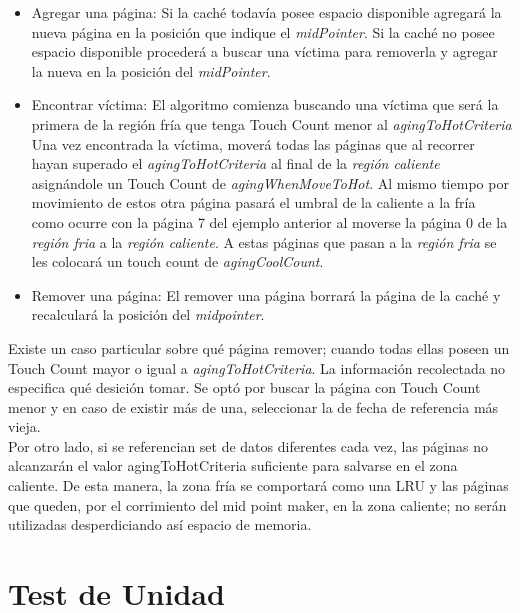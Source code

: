 \documentclass[11pt, a4paper, spanish]{article}
\begin{document}
\begin{itemize}
	\item{Agregar una p\'agina:
		Si la cach\'e todav\'ia posee espacio disponible agregar\'a la nueva p\'agina en la posici\'on que indique el \textit{midPointer}.
		Si la cach\'e no posee espacio disponible proceder\'a a buscar una v\'ictima para removerla y agregar la nueva en la posici\'on del \textit{midPointer}.
	}
	\item{Encontrar v\'ictima: }
		El algoritmo comienza buscando una v\'ictima que ser\'a la primera de la regi\'on fr\'ia que tenga Touch Count menor al \textit{agingToHotCriteria}
		Una vez encontrada la v\'ictima, mover\'a todas las p\'aginas que al recorrer hayan superado el  \textit{agingToHotCriteria} al
		final de la \textit{regi\'on caliente} asign\'andole un Touch Count de \textit{agingWhenMoveToHot}. Al mismo tiempo por movimiento de estos otra p\'agina pasar\'a
		el umbral de la caliente a la fr\'ia como ocurre con la p\'agina 7 del ejemplo anterior al moverse la p\'agina 0 de la \textit{regi\'on fria}
		a la \textit{regi\'on caliente}. A estas p\'aginas que pasan a la \textit{regi\'on fria} se les colocar\'a un touch count de \textit{agingCoolCount}.
		
	\item{Remover una p\'agina: }
		El remover una p\'agina borrar\'a la p\'agina de la cach\'e y recalcular\'a la posici\'on del \textit{midpointer}.
\end{itemize}

Existe un caso particular sobre qu\'e p\'agina remover; cuando todas ellas poseen un Touch Count mayor o igual a \textit{agingToHotCriteria}. La informaci\'on recolectada no especifica qu\'e desici\'on tomar. Se opt\'o por buscar la p\'agina con Touch Count menor y en caso de existir m\'as de una, seleccionar la de fecha de referencia m\'as vieja.\\

Por otro lado, si se referencian set de datos diferentes cada vez, las p\'aginas no alcanzar\'an el valor agingToHotCriteria suficiente para salvarse en el zona caliente. De esta manera, la zona fr\'ia se comportar\'a como una LRU y las p\'aginas que queden, por el corrimiento del mid point maker, en la zona caliente; no ser\'an utilizadas desperdiciando as\'i espacio de memoria.\\

\newpage
\section{Test de Unidad}
\end{document}
